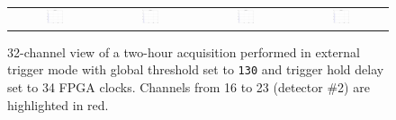 \begin{figure}[hbt!]
\begin{tabular}{cccc}
        \includegraphics[width=0.204\textwidth]{Images/chap3/results/muons/ch_ext_trigger/incoming_energy_32channels_34_2hr_28_keV.pdf} & \includegraphics[width=0.204\textwidth]{Images/chap3/results/muons/ch_ext_trigger/incoming_energy_32channels_34_2hr_29_keV.pdf} & \includegraphics[width=0.204\textwidth]{Images/chap3/results/muons/ch_ext_trigger/incoming_energy_32channels_34_2hr_30_keV.pdf} & \includegraphics[width=0.204\textwidth]{Images/chap3/results/muons/ch_ext_trigger/incoming_energy_32channels_34_2hr_31_keV.pdf}\\
    \end{tabular}
    \caption{32-channel view of a two-hour acquisition performed in external trigger mode with global threshold set to \texttt{130} and trigger hold delay set to 34 FPGA clocks. Channels from 16 to 23 (detector \#2) are highlighted in red.}
    \label{figMUON32channels}
\end{figure}
